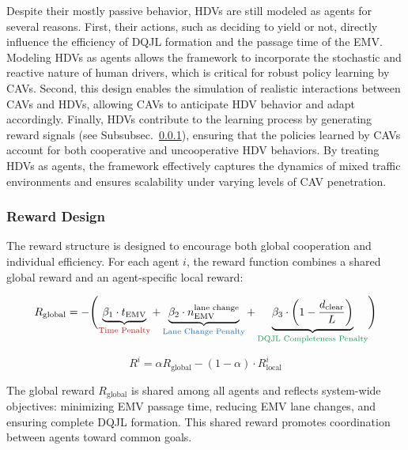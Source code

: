 Despite their mostly passive behavior, HDVs are still modeled as agents for several reasons. First, their actions, such as deciding to yield or not, directly influence the efficiency of DQJL formation and the passage time of the EMV. Modeling HDVs as agents allows the framework to incorporate the stochastic and reactive nature of human drivers, which is critical for robust policy learning by CAVs. Second, this design enables the simulation of realistic interactions between CAVs and HDVs, allowing CAVs to anticipate HDV behavior and adapt accordingly. Finally, HDVs contribute to the learning process by generating reward signals (see Subsubsec.~\ref{subsubsec:reward_design}), ensuring that the policies learned by CAVs account for both cooperative and uncooperative HDV behaviors. By treating HDVs as agents, the framework effectively captures the dynamics of mixed traffic environments and ensures scalability under varying levels of CAV penetration.


\subsubsection{Reward Design}\label{subsubsec:reward_design}

The reward structure is designed to encourage both global cooperation and individual efficiency. For each agent \(i\), the reward function combines a shared global reward and an agent-specific local reward:

\begin{equation}\label{eqn:global_reward}
R_{\text{global}} = -\Biggl(
\underbrace{\beta_1 \cdot t_{\text{EMV}}}_{\textcolor{BrickRed}{\text{Time Penalty}}}
+ \underbrace{\beta_2 \cdot n_{\text{EMV}}^{\text{lane change}}}_{\textcolor{RoyalBlue}{\text{Lane Change Penalty}}} 
+ \underbrace{\beta_3 \cdot \left(1 - \frac{d_{\text{clear}}}{L}\right)}_{\textcolor{ForestGreen}{\text{DQJL Completeness Penalty}}}
\Biggr)
\end{equation}

\begin{equation}\label{eqn:return}
R^i = \alpha R_{\text{global}} - (1 - \alpha) \cdot R_{\text{local}}^i
\end{equation}

The global reward \(R_{\text{global}}\) is shared among all agents and reflects system-wide objectives: minimizing EMV passage time, reducing EMV lane changes, and ensuring complete DQJL formation. This shared reward promotes coordination between agents toward common goals.

